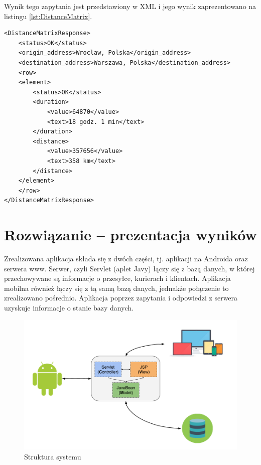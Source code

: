 \documentclass[eng,printmode,oneside]{mgr}
\begin{document}
Wynik tego zapytania jest przedstawiony w XML i jego wynik zaprezentowano na
listingu \ref{lst:DistanceMatrix}.

\begin{lstlisting}[caption=Przykład odpowiedzi na zapytanie
\texttt{DistanceMatrix}\, trasa Wrocław -- Warszawa,label=lst:DistanceMatrix] 
<DistanceMatrixResponse>
	<status>OK</status>
	<origin_address>Wroclaw, Polska</origin_address>
	<destination_address>Warszawa, Polska</destination_address>
	<row>
	<element>
		<status>OK</status>
		<duration>
			<value>64870</value>
			<text>18 godz. 1 min</text>
		</duration>
		<distance>
			<value>357656</value>
			<text>358 km</text>
		</distance>
	</element>
	</row>
</DistanceMatrixResponse>
\end{lstlisting}

\chapter{Rozwiązanie -- prezentacja wyników}

Zrealizowana aplikacja składa się z dwóch części, tj. aplikacji na Androida oraz
serwera www. Serwer, czyli Servlet (aplet Javy) łączy się z bazą
danych, w której przechowywane są informacje o przesyłce, kurierach i
klientach. Aplikacja mobilna również łączy się z tą samą bazą danych,
jednakże połączenie to zrealizowano pośrednio. Aplikacja poprzez zapytania i odpowiedzi z
serwera uzyskuje informacje o stanie bazy danych. 

\begin{figure}[h]
\centering
\includegraphics[width=100ex]{StrukturaSystemu.png}
\caption{Struktura systemu}
\label{StrukturaSystemu}
\end{figure}
\end{document}
